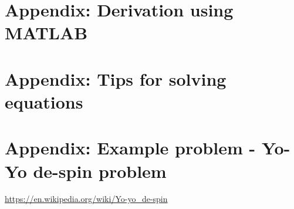 \documentclass{article}
\begin{document}
\section*{Appendix: Derivation using MATLAB}
\newpage
\section*{Appendix: Tips for solving equations}
\newpage
\section*{Appendix: Example problem - Yo-Yo de-spin problem}
\url{https://en.wikipedia.org/wiki/Yo-yo_de-spin}


\end{document}
